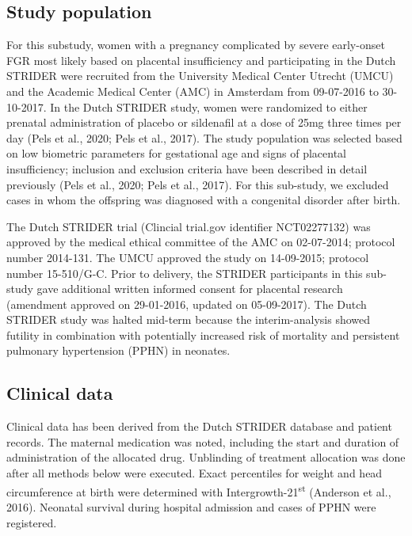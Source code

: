 \documentclass[authordate, empirical]{jote-new-article}
\begin{document}
\subsection{Study population}



For this substudy, women with a pregnancy complicated by severe early-onset FGR most likely based on placental insufficiency and participating in the Dutch STRIDER were recruited from the University Medical Center Utrecht (UMCU) and the Academic Medical Center (AMC) in Amsterdam from 09-07-2016 to 30-10-2017. In the Dutch STRIDER study, women were randomized to either prenatal administration of placebo or sildenafil at a dose of 25mg three times per day (Pels et al., 2020; Pels et al., 2017). The study population was selected based on low biometric parameters for gestational age and signs of placental insufficiency; inclusion and exclusion criteria have been described in detail previously (Pels et al., 2020; Pels et al., 2017). For this sub-study, we excluded cases in whom the offspring was diagnosed with a congenital disorder after birth.



The Dutch STRIDER trial (Clincial trial.gov identifier NCT02277132) was approved by the medical ethical committee of the AMC on 02-07-2014; protocol number 2014-131. The UMCU approved the study on 14-09-2015; protocol number 15-510/G-C. Prior to delivery, the STRIDER participants in this sub-study gave additional written informed consent for placental research (amendment approved on 29-01-2016, updated on 05-09-2017). The Dutch STRIDER study was halted mid-term because the interim-analysis showed futility in combination with potentially increased risk of mortality and persistent pulmonary hypertension (PPHN) in neonates.







\subsection{Clinical data }



Clinical data has been derived from the Dutch STRIDER database and patient records. The maternal medication was noted, including the start and duration of administration of the allocated drug. Unblinding of treatment allocation was done after all methods below were executed. Exact percentiles for weight and head circumference at birth were determined with Intergrowth-21\textsuperscript{st} (Anderson et al., 2016). Neonatal survival during hospital admission and cases of PPHN were registered.
\end{document}
